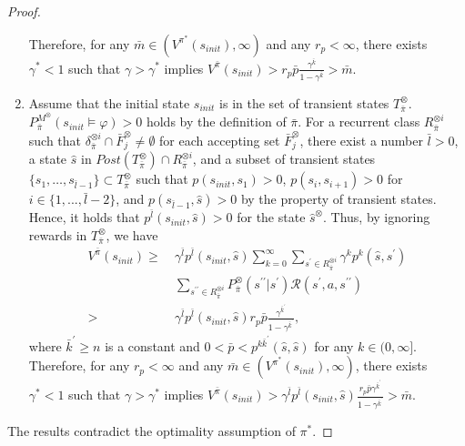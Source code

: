 \documentclass[letterpaper, 10 pt, conference]{ieeeconf}  %
\begin{document}
\begin{proof}
\begin{enumerate}
    Therefore, for any $\bar{m} \in (V^{\pi^{\ast}}(s_{init}), \infty)$ and any $r_p < \infty$, there exists $\gamma^{\ast}<1$ such that $\gamma > \gamma^{\ast}$ implies $V^{\bar{\pi}}(s_{init}) > r_p \bar{p} \frac{\gamma^{\bar{k}}}{ 1 - \gamma^{\bar{k}} } > \bar{m}.$

    \item Assume that the initial state $s_{init}$ is in the set of transient states $T_{\bar{\pi}}^{\otimes}$.
    $P^{M^{\otimes}}_{\bar{\pi}}(s_{init} \models \varphi) > 0$ holds by the definition of $\bar{\pi}$. For a recurrent class $R^{\otimes i}_{\bar{\pi}}$ such that $\delta^{\otimes i}_{\bar{\pi}} \cap \bar{F}^{\otimes}_j \neq \emptyset$ for each accepting set
    $\bar{F}^{\otimes}_j$, there exist a number $\bar{l} > 0$, a state $\hat{s}$ in $Post(T^{\otimes}_{\bar{\pi}}) \cap R^{\otimes i}_{\bar{\pi}}$, and a subset of transient states $\{ s_1, \ldots , s_{\bar{l}-1} \} \subset T^\otimes_{\bar{\pi}}$ such that $p(s_{init}, s_1)>0$, $p(s_{i}, s_{i+1})>0$ for $i \in \{ 1,...,\bar{l}-2 \}$, and $p(s_{\bar{l}-1}, \hat{s})>0$ by the property of transient states.
    Hence, it holds that $p^{\bar{l}}(s_{init}, \hat{s}) > 0$ for the state $\hat{s}^{\otimes}$. Thus, by ignoring rewards in $T^{\otimes}_{\bar{\pi}}$, we have
     \begin{align}
        V^{\bar{\pi}}(s_{init}) %
        \geq\ & \gamma^{\bar{l}} p^{\bar{l}}(s_{init}, \hat{s}) \sum_{k=0}^{\infty} \sum_{s^{\prime} \in R^{\otimes i}_{\bar{\pi}}} \gamma^k p^k(\hat{s}, s^{\prime}) \nonumber \\
        & \sum_{s^{\prime \prime} \in R^{\otimes i}_{\bar{\pi}}} P^{\otimes}_{\bar{\pi}}(s^{\prime \prime} | s^{\prime}) \mathcal{R}(s^{\prime}, a, s^{\prime \prime}) \nonumber \\
        >\ & \gamma^{\bar{l}} p^{\bar{l}}(s_{init}, \hat{s}) r_p \bar{p} \frac{\gamma^{\bar{k}^{\prime}}}{ 1 - \gamma^{\bar{k}^{\prime}} }, \nonumber
     \end{align}
     where $\bar{k}^{\prime}  \geq n$ is a constant and $0<\bar{p}< p^{k \bar{k}^{\prime}}(\hat{s}, \hat{s})$ for any $k \in (0, \infty]$.
     Therefore, for any $r_p < \infty$ and any $\bar{m} \in (V^{\pi^{\ast}}(s_{init}), \infty)$, there exists $\gamma^{\ast}<1$ such that $\gamma > \gamma^{\ast}$ implies
     $V^{\bar{\pi}}(s_{init}) > \gamma^{\bar{l}} p^{\bar{l}}(s_{init}, \hat{s}) \frac{r_p \bar{p} \gamma^{\bar{k}^{\prime}}}{ 1 - \gamma^{\bar{k}^{\prime}} } > \bar{m}$.
  \end{enumerate}

The results contradict the optimality assumption of $\pi^{\ast}$.
\end{proof}
\end{document}

